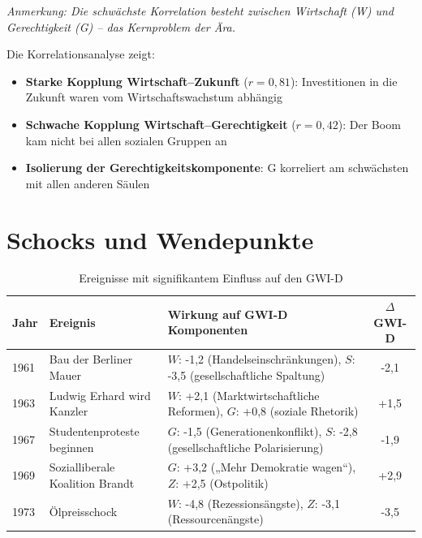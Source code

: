 \begin{flushleft}
\footnotesize{\textit{Anmerkung: Die schwächste Korrelation besteht zwischen Wirtschaft (W) und Gerechtigkeit (G) – das Kernproblem der Ära.}}
\end{flushleft}

Die Korrelationsanalyse zeigt:
\begin{itemize}
    \item \textbf{Starke Kopplung Wirtschaft–Zukunft} (\(r = 0,81\)): Investitionen in die Zukunft waren vom Wirtschaftswachstum abhängig
    \item \textbf{Schwache Kopplung Wirtschaft–Gerechtigkeit} (\(r = 0,42\)): Der Boom kam nicht bei allen sozialen Gruppen an
    \item \textbf{Isolierung der Gerechtigkeitskomponente}: G korreliert am schwächsten mit allen anderen Säulen
\end{itemize}

\section{Schocks und Wendepunkte}

\begin{table}[ht]
    \centering
    \caption{Ereignisse mit signifikantem Einfluss auf den GWI-D}
    \label{tab:ereignisse_wirtschaftswunder}
    \begin{tabular}{llp{8cm}c}
        \toprule
        \textbf{Jahr} & \textbf{Ereignis} & \textbf{Wirkung auf GWI-D Komponenten} & \textbf{$\Delta$ GWI-D} \\
        \midrule
        1961 & Bau der Berliner Mauer & \(W\): -1,2 (Handelseinschränkungen), \(S\): -3,5 (gesellschaftliche Spaltung) & -2,1 \\
        1963 & Ludwig Erhard wird Kanzler & \(W\): +2,1 (Marktwirtschaftliche Reformen), \(G\): +0,8 (soziale Rhetorik) & +1,5 \\
        1967 & Studentenproteste beginnen & \(G\): -1,5 (Generationenkonflikt), \(S\): -2,8 (gesellschaftliche Polarisierung) & -1,9 \\
        1969 & Sozialliberale Koalition Brandt & \(G\): +3,2 („Mehr Demokratie wagen“), \(Z\): +2,5 (Ostpolitik) & +2,9 \\
        1973 & Ölpreisschock & \(W\): -4,8 (Rezessionsängste), \(Z\): -3,1 (Ressourcenängste) & -3,5 \\
        \bottomrule
    \end{tabular}
\end{table}

